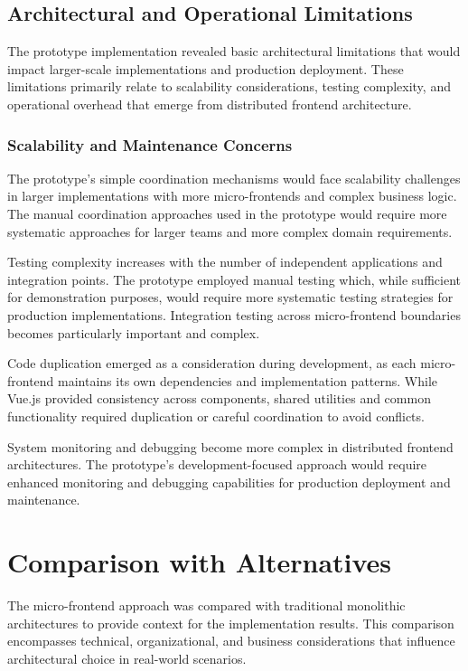 \documentclass[12pt,a4paper]{report}
\begin{document}
\subsection{Architectural and Operational Limitations}

The prototype implementation revealed basic architectural limitations that would impact larger-scale implementations and production deployment. These limitations primarily relate to scalability considerations, testing complexity, and operational overhead that emerge from distributed frontend architecture.

\subsubsection{Scalability and Maintenance Concerns}

The prototype's simple coordination mechanisms would face scalability challenges in larger implementations with more micro-frontends and complex business logic. The manual coordination approaches used in the prototype would require more systematic approaches for larger teams and more complex domain requirements.

Testing complexity increases with the number of independent applications and integration points. The prototype employed manual testing which, while sufficient for demonstration purposes, would require more systematic testing strategies for production implementations. Integration testing across micro-frontend boundaries becomes particularly important and complex.

Code duplication emerged as a consideration during development, as each micro-frontend maintains its own dependencies and implementation patterns. While Vue.js provided consistency across components, shared utilities and common functionality required duplication or careful coordination to avoid conflicts.

System monitoring and debugging become more complex in distributed frontend architectures. The prototype's development-focused approach would require enhanced monitoring and debugging capabilities for production deployment and maintenance.

\section{Comparison with Alternatives}

The micro-frontend approach was compared with traditional monolithic architectures to provide context for the implementation results. This comparison encompasses technical, organizational, and business considerations that influence architectural choice in real-world scenarios.
\end{document}
